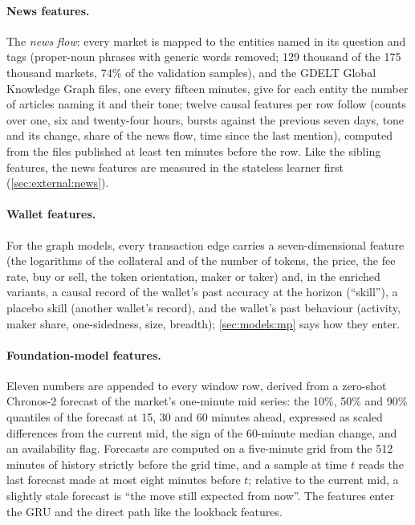 \paragraph{News features.}  The \emph{news flow}: every market is mapped to the entities named in its question and tags
(proper-noun phrases with generic words removed; 129 thousand of the 175 thousand markets,
74\% of the validation samples), and the GDELT Global Knowledge Graph files, one every fifteen
minutes, give for each entity the number of articles naming it and their tone; twelve causal
features per row follow (counts over one, six and twenty-four hours, bursts against the
previous seven days, tone and its change, share of the news flow, time since the last
mention), computed from the files published at least ten minutes before the row.  Like the sibling features, the news features
are measured in the stateless learner first (\cref{sec:external:news}).

\paragraph{Wallet features.}  For the graph models, every transaction edge carries a
seven-dimensional feature (the logarithms of the collateral and of the number of tokens,
the price, the fee rate, buy or sell, the token orientation, maker or taker) and, in
the enriched variants, a causal record of the wallet's past accuracy at the horizon
(``skill''), a placebo skill (another wallet's record), and the wallet's past behaviour
(activity, maker share, one-sidedness, size, breadth); \cref{sec:models:mp} says how they
enter.

\paragraph{Foundation-model features.}\label{sec:models:tsfm}  Eleven numbers are appended
to every window row, derived from a zero-shot Chronos-2 forecast \cite{ansari2025chronos2} of the market's one-minute mid series: the
10\%, 50\% and 90\% quantiles of the forecast at 15, 30 and 60 minutes ahead, expressed
as scaled differences from the current mid, the sign of the 60-minute median change,
and an availability flag.  Forecasts are computed on a five-minute grid from the
512 minutes of history strictly before the grid time, and a sample at time $t$ reads
the last forecast made at most eight minutes before $t$; relative to the current mid,
a slightly stale forecast is ``the move still expected from now''.  The features enter
the GRU and the direct path like the lookback features.

